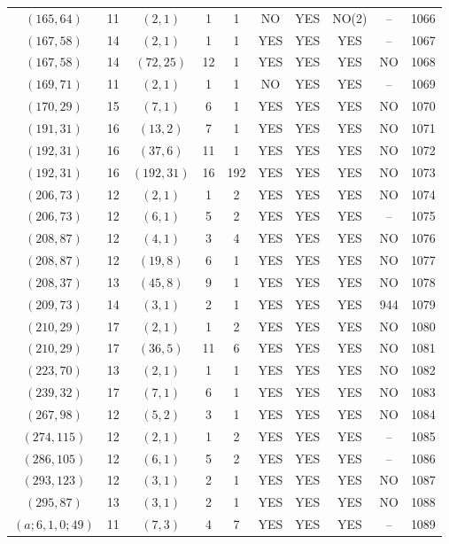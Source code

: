 \begin{longtable}{|c|c|c|c|c|c|c|c|c|c|}
$(165, 64)$ & 11 & $(2, 1)$ & 1 & 1 & NO & YES & NO(2) & -- & 1066\\
$(167, 58)$ & 14 & $(2, 1)$ & 1 & 1 & YES & YES & YES & -- & 1067\\
$(167, 58)$ & 14 & $(72, 25)$ & 12 & 1 & YES & YES & YES & NO & 1068\\
$(169, 71)$ & 11 & $(2, 1)$ & 1 & 1 & NO & YES & YES & -- & 1069\\
$(170, 29)$ & 15 & $(7, 1)$ & 6 & 1 & YES & YES & YES & NO & 1070\\
$(191, 31)$ & 16 & $(13, 2)$ & 7 & 1 & YES & YES & YES & NO & 1071\\
$(192, 31)$ & 16 & $(37, 6)$ & 11 & 1 & YES & YES & YES & NO & 1072\\
$(192, 31)$ & 16 & $(192, 31)$ & 16 & 192 & YES & YES & YES & NO & 1073\\
$(206, 73)$ & 12 & $(2, 1)$ & 1 & 2 & YES & YES & YES & NO & 1074\\
$(206, 73)$ & 12 & $(6, 1)$ & 5 & 2 & YES & YES & YES & -- & 1075\\
$(208, 87)$ & 12 & $(4, 1)$ & 3 & 4 & YES & YES & YES & NO & 1076\\
$(208, 87)$ & 12 & $(19, 8)$ & 6 & 1 & YES & YES & YES & NO & 1077\\
$(208, 37)$ & 13 & $(45, 8)$ & 9 & 1 & YES & YES & YES & NO & 1078\\
$(209, 73)$ & 14 & $(3, 1)$ & 2 & 1 & YES & YES & YES & 944 & 1079\\
$(210, 29)$ & 17 & $(2, 1)$ & 1 & 2 & YES & YES & YES & NO & 1080\\
$(210, 29)$ & 17 & $(36, 5)$ & 11 & 6 & YES & YES & YES & NO & 1081\\
$(223, 70)$ & 13 & $(2, 1)$ & 1 & 1 & YES & YES & YES & NO & 1082\\
$(239, 32)$ & 17 & $(7, 1)$ & 6 & 1 & YES & YES & YES & NO & 1083\\
$(267, 98)$ & 12 & $(5, 2)$ & 3 & 1 & YES & YES & YES & NO & 1084\\
$(274, 115)$ & 12 & $(2, 1)$ & 1 & 2 & YES & YES & YES & -- & 1085\\
$(286, 105)$ & 12 & $(6, 1)$ & 5 & 2 & YES & YES & YES & -- & 1086\\
$(293, 123)$ & 12 & $(3, 1)$ & 2 & 1 & YES & YES & YES & NO & 1087\\
$(295, 87)$ & 13 & $(3, 1)$ & 2 & 1 & YES & YES & YES & NO & 1088\\
$(a; 6, 1, 0; 49)$ & 11 & $(7, 3)$ & 4 & 7 & YES & YES & YES & -- & 1089\\

\end{longtable}
